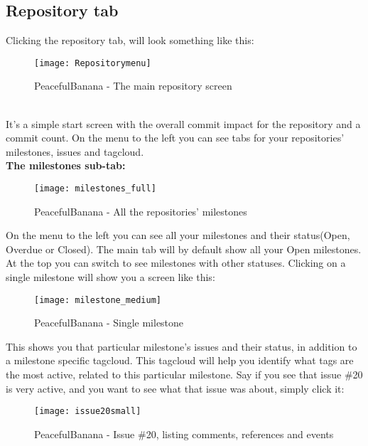%
%

\subsection{Repository tab}
Clicking the repository tab, will look something like this:
\begin{figure}[h!]
\label{repository}
\centering
	\texttt{[image: Repositorymenu]}
\caption{PeacefulBanana - The main repository screen}
\end{figure}
\\
It's a simple start screen with the overall commit impact for the repository and a commit count. 
On the menu to the left you can see tabs for your repositories' milestones, issues and tagcloud.
\\
\textbf{The milestones sub-tab:}
\begin{figure}[h!]
\label{milestones}
\centering
	\texttt{[image: milestones\_full]}
\caption{PeacefulBanana - All the repositories' milestones}
\end{figure}
\newpage
On the menu to the left you can see all your milestones and their status(Open, Overdue or Closed). The main tab will by default show all your Open milestones. At the top you can switch to see milestones with other statuses.
Clicking on a single milestone will show you a screen like this:
\begin{figure}[h!]
\label{milestonessingular}
\centering
	\texttt{[image: milestone\_medium]}
\caption{PeacefulBanana - Single milestone}
\end{figure}
This shows you that particular milestone's issues and their status, in addition to a milestone specific tagcloud. This tagcloud will help you identify what tags are the most active, related to this particular milestone. 
Say if you see that issue \#20 is very active, and you want to see what that issue was about, simply click it:
\begin{figure}[h!]
\label{milestonessingular}
\centering
	\texttt{[image: issue20small]}
\caption{PeacefulBanana - Issue \#20, listing comments, references and events}
\end{figure}

%
%

